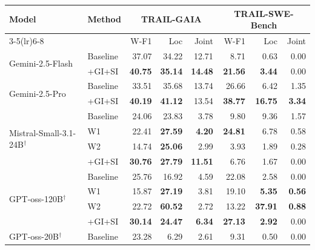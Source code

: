 \begin{table}[t]
\centering
\small
\setlength{\tabcolsep}{5pt}
\renewcommand{\arraystretch}{1.2}
\begin{tabular}{l l rrr @{\hspace{10pt}} rrr}
\toprule
\multirow{2}{*}{\textbf{Model}} &
\multirow{2}{*}{\textbf{Method}} &
\multicolumn{3}{c}{\textbf{TRAIL-GAIA}} &
\multicolumn{3}{c}{\textbf{TRAIL-SWE-Bench}} \\
\cmidrule(lr){3-5}\cmidrule(lr){6-8}
& & W-F1 & Loc & Joint & W-F1 & Loc & Joint \\
\midrule
\multirow{2}{*}{Gemini-2.5-Flash}
  & Baseline  & 37.07 & 34.22 & 12.71 &  8.71 &  0.63 & 0.00 \\
  & +GI+SI    & \textbf{40.75} & \textbf{35.14} & \textbf{14.48} &
               \textbf{21.56} & \textbf{3.44} & 0.00 \\[3pt]
\multirow{2}{*}{Gemini-2.5-Pro}
  & Baseline  & 33.51 & 35.68 & 13.74 &
               26.66 &  6.42 &  1.35 \\
  & +GI+SI    & \textbf{40.19} & \textbf{41.12} & 13.54 &
               \textbf{38.77} & \textbf{16.75} & \textbf{3.34} \\[3pt]
\multirow{4}{*}{Mistral-Small-3.1-24B$^{\dagger}$}
  & Baseline  & 24.06 & 23.83 &  3.78 &
               9.80 &  9.36 &  1.57 \\
  & W1        & 22.41 & \textbf{27.59} & \textbf{4.20} &
               \textbf{24.81} &  6.78 &  0.58 \\
  & W2        & 14.74 & \textbf{25.06} &  2.99 &
                3.93 &  1.89 &  0.28 \\
  & +GI+SI    & \textbf{30.76} & \textbf{27.79} & \textbf{11.51} &
               6.76 &  1.67 &  0.00 \\[3pt]
\multirow{4}{*}{GPT-oss-120B$^{\dagger}$}
  & Baseline  & 25.76 & 16.92 &  4.59 &
               22.08 &  2.58 &  0.00 \\
  & W1        & 15.87 & \textbf{27.19} &  3.81 &
               19.10 & \textbf{5.35} & \textbf{0.56} \\
  & W2        & 22.72 & \textbf{60.52} &  2.72 &
               13.22 & \textbf{37.91} & \textbf{0.88} \\
  & +GI+SI    & \textbf{30.14} & \textbf{24.47} & \textbf{6.34} &
               \textbf{27.13} & \textbf{2.92} &  0.00 \\[3pt]
\multirow{4}{*}{GPT-oss-20B$^{\dagger}$}
  & Baseline  & 23.28 &  6.29 &  2.61 &
               9.31 &  0.50 &  0.00 \\

\end{tabular}
\end{table}
